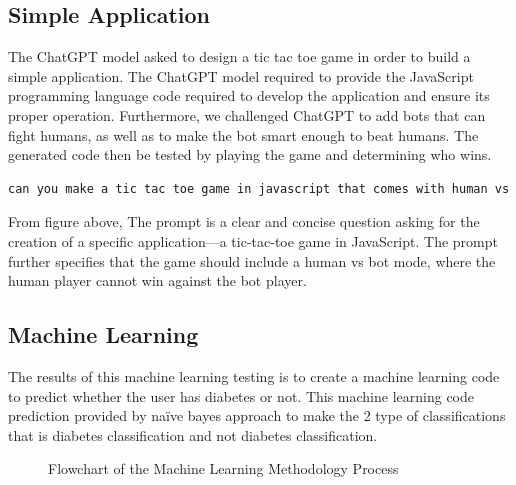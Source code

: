 \documentclass[conference]{IEEEtran}
\begin{document}
\subsection{Simple Application}
The ChatGPT model asked to design a tic tac toe game in order to build a simple application. The ChatGPT model required to provide the JavaScript programming language code required to develop the application and ensure its proper operation. Furthermore, we challenged ChatGPT to add bots that can fight humans, as well as to make the bot smart enough to beat humans. The generated code then be tested by playing the game and determining who wins.

\vspace{0pt}
\begin{lstlisting}[caption={Simple Application Prompt}, basicstyle=\ttfamily,language=TeX]
can you make a tic tac toe game in javascript that comes with human vs bot game, where the human cannot win against the bot
\end{lstlisting}

From figure above, The prompt is a clear and concise question asking for the creation of a specific application—a tic-tac-toe game in JavaScript. The prompt further specifies that the game should include a human vs bot mode, where the human player cannot win against the bot player.

\subsection{Machine Learning}
The results of this machine learning testing is to create a machine learning code to predict whether the user has diabetes or not. This machine learning code prediction provided by naïve bayes approach to make the 2 type of classifications that is diabetes classification and not diabetes classification. 

\begin{figure}[H]
    \centering
    \caption{Flowchart of the Machine Learning Methodology Process}
\end{figure}
\end{document}
